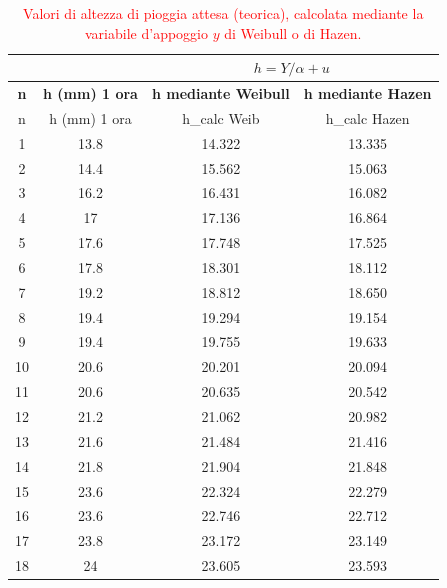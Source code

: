 \begin{table}[H] \centering
    \caption{\textcolor{red}{Valori di altezza di pioggia attesa (teorica), calcolata mediante la variabile d'appoggio $y$ di Weibull o di Hazen.}}
    \begin{tabular}{cccc}
 & & \multicolumn{2}{c}{$h = Y/\alpha + u$}       \\
 \toprule
    \textbf{n} & \textbf{h (mm)  1 ora} & \textbf{h mediante Weibull} & \textbf{h mediante Hazen} \\
\midrule
    n         & h (mm)     1 ora & h\_calc Weib   & h\_calc Hazen  \\
    1         & 13.8             & 14.322         & 13.335         \\
    2         & 14.4             & 15.562         & 15.063         \\
    3         & 16.2             & 16.431         & 16.082         \\
    4         & 17               & 17.136         & 16.864         \\
    5         & 17.6             & 17.748         & 17.525         \\
    6         & 17.8             & 18.301         & 18.112         \\
    7         & 19.2             & 18.812         & 18.650         \\
    8         & 19.4             & 19.294         & 19.154         \\
    9         & 19.4             & 19.755         & 19.633         \\
    10        & 20.6             & 20.201         & 20.094         \\
    11        & 20.6             & 20.635         & 20.542         \\
    12        & 21.2             & 21.062         & 20.982         \\
    13        & 21.6             & 21.484         & 21.416         \\
    14        & 21.8             & 21.904         & 21.848         \\
    15        & 23.6             & 22.324         & 22.279         \\
    16        & 23.6             & 22.746         & 22.712         \\
    17        & 23.8             & 23.172         & 23.149         \\
    18        & 24               & 23.605         & 23.593         \\

\end{tabular}
\end{table}
